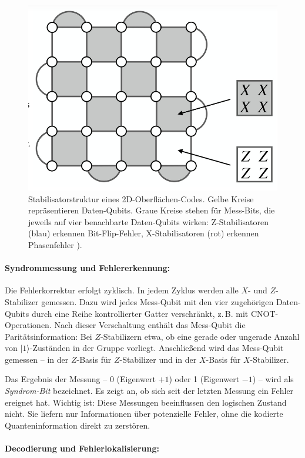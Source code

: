 \begin{figure}[H]
    \centering
    \includegraphics[width=0.6\linewidth]{images/error-correction/Abb4_Oberflaechencode_1.png}
    \caption{Stabilisatorstruktur eines 2D-Oberflächen-Codes. Gelbe Kreise repräsentieren Daten-Qubits. Graue Kreise stehen für Mess-Bits, die jeweils auf vier benachbarte Daten-Qubits wirken: Z-Stabilisatoren (blau) erkennen Bit-Flip-Fehler, X-Stabilisatoren (rot) erkennen Phasenfehler \cite{higgot2023}).}
    \label{fig:oberflaechencode-stabilisatoren}
\end{figure}


\paragraph{Syndrommessung und Fehlererkennung:}

Die Fehlerkorrektur erfolgt zyklisch. In jedem Zyklus werden alle \(X\)- und \(Z\)-Stabilizer gemessen. Dazu wird jedes Mess-Qubit mit den vier zugehörigen Daten-Qubits durch eine Reihe kontrollierter Gatter verschränkt, z.\,B. mit CNOT-Operationen. Nach dieser Verschaltung enthält das Mess-Qubit die Paritätsinformation: Bei \(Z\)-Stabilizern etwa, ob eine gerade oder ungerade Anzahl von \( |1\rangle \)-Zuständen in der Gruppe vorliegt. Anschließend wird das Mess-Qubit gemessen – in der \(Z\)-Basis für \(Z\)-Stabilizer und in der \(X\)-Basis für \(X\)-Stabilizer.

Das Ergebnis der Messung – 0 (Eigenwert \(+1\)) oder 1 (Eigenwert \(-1\)) – wird als \emph{Syndrom-Bit} bezeichnet. Es zeigt an, ob sich seit der letzten Messung ein Fehler ereignet hat. Wichtig ist: Diese Messungen beeinflussen den logischen Zustand nicht. Sie liefern nur Informationen über potenzielle Fehler, ohne die kodierte Quanteninformation direkt zu zerstören.

\paragraph{Decodierung und Fehlerlokalisierung:}

